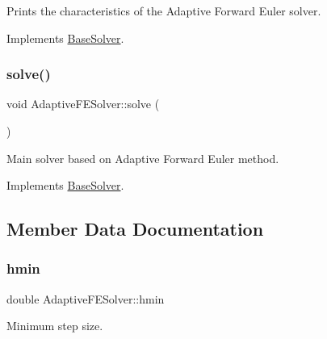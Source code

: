 Prints the characteristics of the Adaptive Forward Euler solver. 



Implements \hyperlink{classBaseSolver_a44725e315b208c0ee69ba8fd5d172e09}{Base\+Solver}.

\mbox{\label{classAdaptiveFESolver_a2d18dfe7c73872501d96df7fb1967f5f}} 
\subsubsection{\texorpdfstring{solve()}{solve()}}
{\footnotesize\ttfamily void Adaptive\+F\+E\+Solver\+::solve (\begin{DoxyParamCaption}{ }\end{DoxyParamCaption})\hspace{0.3cm}{\ttfamily [virtual]}}



Main solver based on Adaptive Forward Euler method. 



Implements \hyperlink{classBaseSolver_a57f3b4ddec8693c61917aa37a2bac660}{Base\+Solver}.



\subsection{Member Data Documentation}
\mbox{\label{classAdaptiveFESolver_a138ebbe940e45ae7b34132b571f6b8d5}} 
\subsubsection{\texorpdfstring{hmin}{hmin}}
{\footnotesize\ttfamily double Adaptive\+F\+E\+Solver\+::hmin\hspace{0.3cm}{\ttfamily [private]}}



Minimum step size. 

\mbox{\label{classAdaptiveFESolver_a589e2aa0d09dbbcc103f5c072a6da69a}} 
